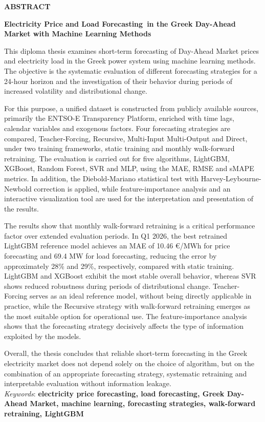 \begin{center}  \Large{\textbf{ABSTRACT}}  \end{center}
\begin{center}  \Large{\textbf{Electricity Price and Load Forecasting\
in the Greek Day-Ahead Market with Machine Learning Methods}}  \end{center}
\vspace{3pt}
\vspace{10pt}
\noindent
This diploma thesis examines short-term forecasting of Day-Ahead Market prices and electricity load in the Greek power
 system using machine learning methods. The objective is the systematic evaluation of different forecasting strategies for a 24-hour horizon and the investigation of their behavior during periods of increased volatility and distributional change.

For this purpose, a unified dataset is constructed from publicly available sources, primarily the ENTSO-E Transparency 
Platform, enriched with time lags, calendar variables and exogenous factors. Four forecasting strategies are compared,
Teacher-Forcing, Recursive, Multi-Input Multi-Output and Direct, under two training frameworks, static training and monthly walk-forward retraining. The evaluation is carried out for five algorithms, LightGBM, XGBoost, Random Forest, SVR and MLP, using the MAE, RMSE and sMAPE metrics. In addition, the Diebold-Mariano statistical test with Harvey-Leybourne-Newbold correction is applied, while feature-importance analysis and an interactive visualization tool are used for the interpretation and presentation of the results.

The results show that monthly walk-forward retraining is a critical performance factor over extended evaluation periods.
 In Q1 2026, the best retrained LightGBM reference model achieves an MAE of 10.46 €/MWh for price forecasting and 69.4 MW 
 for load forecasting, reducing the error by approximately 28\% and 29\%, respectively, compared with static training. LightGBM and XGBoost exhibit the most stable overall behavior, whereas SVR shows reduced robustness during periods of distributional change. Teacher-Forcing serves as an ideal reference model, without being directly applicable in practice, while the Recursive strategy with walk-forward retraining emerges as the most suitable option for operational use. The feature-importance analysis shows that the forecasting strategy decisively affects the type of information exploited by the models.

Overall, the thesis concludes that reliable short-term forecasting in the Greek electricity market does not depend solely on the choice of algorithm, but on the combination of an appropriate forecasting strategy, systematic retraining and interpretable evaluation without information leakage.
\vspace{0.3cm}
\\ \textit{Keywords}: \textbf{electricity price forecasting, load forecasting, Greek Day-Ahead Market, machine learning, forecasting strategies, walk-forward retraining, LightGBM}
